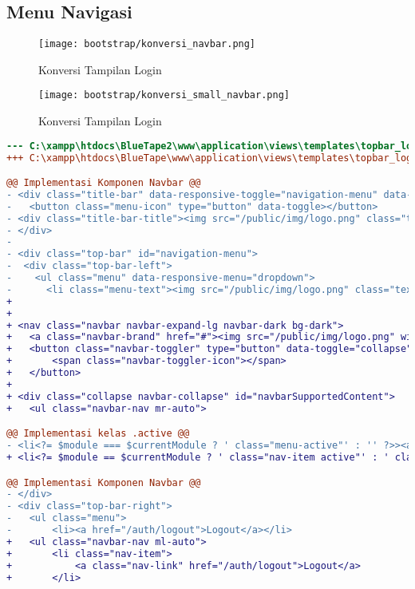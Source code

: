 \subsection{Menu Navigasi}
\begin{figure} [H]
	\centering  
	\texttt{[image: bootstrap/konversi\_navbar.png]}  
	\caption{Konversi Tampilan Login} 
\end{figure}
\begin{figure} [H]
	\centering  
	\texttt{[image: bootstrap/konversi\_small\_navbar.png]}  
	\caption{Konversi Tampilan Login} 
\end{figure}
\begin{lstlisting}[language=diff, caption=Kode untuk Menu Navigasi, label=Entri, basicstyle=\ttfamily, frame=single,
columns=fullflexible, keepspaces=true, breaklines=true]
--- C:\xampp\htdocs\BlueTape2\www\application\views\templates\topbar_loggedin.php	2020-03-25 20:27:35.000000000 +0700
+++ C:\xampp\htdocs\BlueTape\www\application\views\templates\topbar_loggedin.php	2020-03-06 09:56:06.000000000 +0700

@@ Implementasi Komponen Navbar @@
- <div class="title-bar" data-responsive-toggle="navigation-menu" data-hide-for="medium">
- 	<button class="menu-icon" type="button" data-toggle></button>
- <div class="title-bar-title"><img src="/public/img/logo.png" class="textsized" alt="B"/></div>
- </div>
-
- <div class="top-bar" id="navigation-menu">
-  <div class="top-bar-left">
-    <ul class="menu" data-responsive-menu="dropdown">
-      <li class="menu-text"><img src="/public/img/logo.png" class="textsized" alt="B"/></li>
+ 		
+ 			
+ <nav class="navbar navbar-expand-lg navbar-dark bg-dark">
+   <a class="navbar-brand" href="#"><img src="/public/img/logo.png" width="50"/></a>
+ 	<button class="navbar-toggler" type="button" data-toggle="collapse" data-target="#navbarSupportedContent" aria-controls="navbarSupportedContent" aria-expanded="false" aria-label="Toggle navigation">
+ 		<span class="navbar-toggler-icon"></span>
+ 	</button>
+ 		
+ <div class="collapse navbar-collapse" id="navbarSupportedContent">
+ 	<ul class="navbar-nav mr-auto">

@@ Implementasi kelas .active @@
- <li<?= $module === $currentModule ? ' class="menu-active"' : '' ?>><a href="/<?= $module ?>"><?= $this->config->item('module-names')[$module] ?></a></li>
+ <li<?= $module == $currentModule ? ' class="nav-item active"' : ' class="nav-item "' ?>><a class="nav-link" href="/<?= $module ?>"><?= $this->config->item('module-names')[$module] ?></a></li>

@@ Implementasi Komponen Navbar @@
- </div>
- <div class="top-bar-right">
- 	<ul class="menu">
- 		<li><a href="/auth/logout">Logout</a></li>
+ 	<ul class="navbar-nav ml-auto">
+ 		<li class="nav-item">
+ 		    <a class="nav-link" href="/auth/logout">Logout</a>
+ 		</li>

\end{lstlisting}

